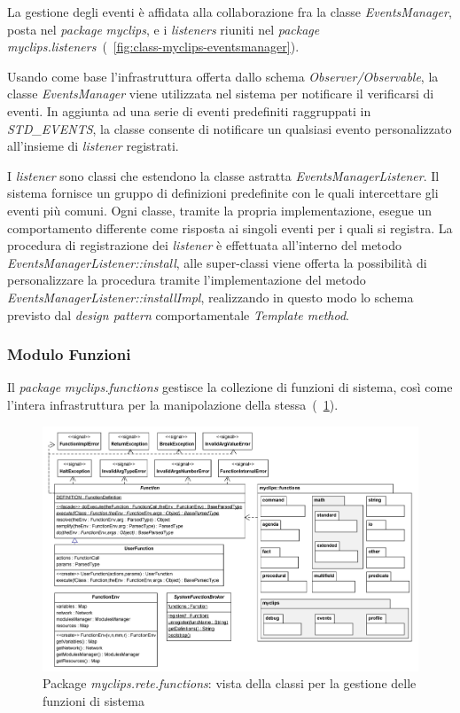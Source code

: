 La gestione degli eventi è affidata alla collaborazione fra la classe \emph{EventsManager}, posta nel \emph{package} \emph{myclips}, e i \emph{listeners} riuniti nel \emph{package} \emph{myclips.listeners}~(\figurename~\ref{fig:class-myclips-eventsmanager}).

Usando come base l'infrastruttura offerta dallo schema \emph{Observer/Observable}, la classe \emph{EventsManager} viene utilizzata nel sistema per notificare il verificarsi di eventi. In aggiunta ad una serie di eventi predefiniti raggruppati in \emph{STD\_EVENTS}, la classe consente di notificare un qualsiasi evento personalizzato all'insieme di \emph{listener} registrati.

I \emph{listener} sono classi che estendono la classe astratta \emph{EventsManagerListener}. Il sistema fornisce un gruppo di definizioni predefinite con le quali intercettare gli eventi più comuni. Ogni classe, tramite la propria implementazione, esegue un comportamento differente come risposta ai singoli eventi per i quali si registra. La procedura di registrazione dei \emph{listener} è effettuata all'interno del metodo \emph{EventsManagerListener::install}, alle super-classi viene offerta la possibilità di personalizzare la procedura tramite l'implementazione del metodo \emph{EventsManagerListener::installImpl}, realizzando in questo modo lo schema previsto dal \emph{design pattern} comportamentale \emph{Template method}.

\subsubsection{Modulo Funzioni}
Il \emph{package} \emph{myclips.functions} gestisce la collezione di funzioni di sistema, così come l'intera infrastruttura per la manipolazione della stessa~(\figurename~\ref{fig:class-myclips-functions}).

\begin{figure}
\centering
\includegraphics[width=1.3\textwidth, angle=270]{Immagini/Capitolo3/Classi/myclips_functions-Globale.png}
\caption{Package \emph{myclips.rete.functions}: vista della classi per la gestione delle funzioni di sistema}\label{fig:class-myclips-functions}
\end{figure}

